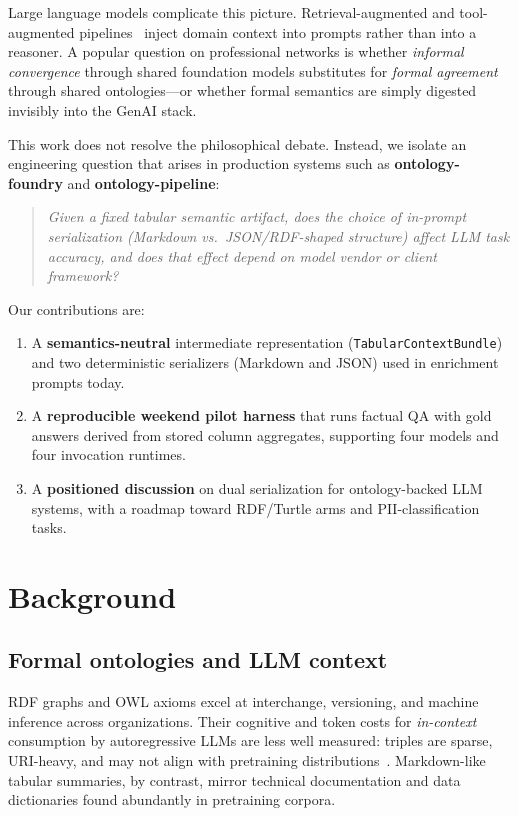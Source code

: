 \documentclass[11pt,a4paper]{article}
\begin{document}
Large language models complicate this picture.
Retrieval-augmented and tool-augmented pipelines~\cite{lewis2020retrieval} inject domain context into prompts rather than into a reasoner.
A popular question on professional networks is whether \emph{informal convergence} through shared foundation models substitutes for \emph{formal agreement} through shared ontologies---or whether formal semantics are simply digested invisibly into the GenAI stack.

This work does not resolve the philosophical debate.
Instead, we isolate an engineering question that arises in production systems such as \textbf{ontology-foundry} and \textbf{ontology-pipeline}:
\begin{quote}
  \emph{Given a fixed tabular semantic artifact, does the choice of in-prompt serialization (Markdown vs.\ JSON/RDF-shaped structure) affect LLM task accuracy, and does that effect depend on model vendor or client framework?}
\end{quote}

Our contributions are:
\begin{enumerate}[leftmargin=*]
  \item A \textbf{semantics-neutral} intermediate representation (\texttt{TabularContextBundle}) and two deterministic serializers (Markdown and JSON) used in enrichment prompts today.
  \item A \textbf{reproducible weekend pilot harness} that runs factual QA with gold answers derived from stored column aggregates, supporting four models and four invocation runtimes.
  \item A \textbf{positioned discussion} on dual serialization for ontology-backed LLM systems, with a roadmap toward RDF/Turtle arms and PII-classification tasks.
\end{enumerate}

\section{Background}
\label{sec:background}

\subsection{Formal ontologies and LLM context}
RDF graphs and OWL axioms excel at interchange, versioning, and machine inference across organizations.
Their cognitive and token costs for \emph{in-context} consumption by autoregressive LLMs are less well measured: triples are sparse, URI-heavy, and may not align with pretraining distributions~\cite{brown2020language}.
Markdown-like tabular summaries, by contrast, mirror technical documentation and data dictionaries found abundantly in pretraining corpora.
\end{document}
